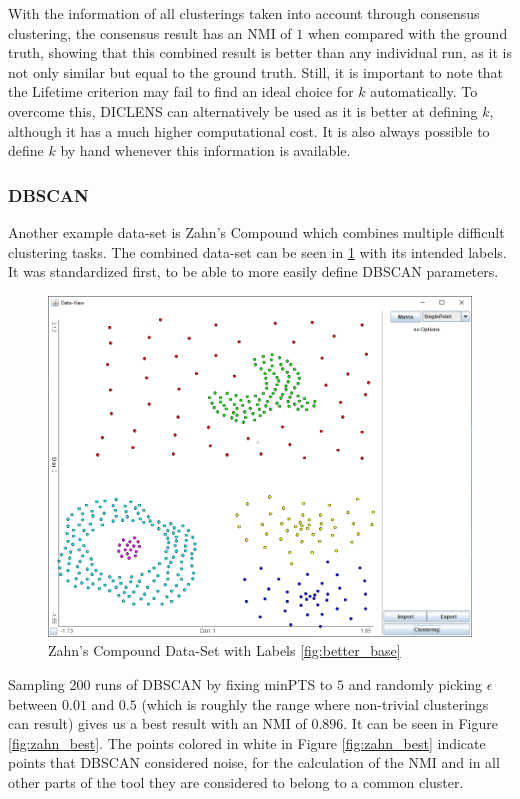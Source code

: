 \documentclass[
	a4paper,
	english,
	twoside,
	openright,               
	11pt                            
	]{report}
\begin{document}
With the information of all clusterings taken into account through consensus clustering, the consensus result has an NMI of $1$ when compared with the ground truth, showing that this combined result is better than any individual run, as it is not only similar but equal to the ground truth. Still, it is important to note that the Lifetime criterion may fail to find an ideal choice for $k$ automatically. To overcome this, DICLENS can alternatively be used as it is better at defining $k$, although it has a much higher computational cost. It is also always possible to define $k$ by hand whenever this information is available.

\subsubsection{DBSCAN}
Another example data-set is Zahn's Compound \cite{1671676} which combines multiple difficult clustering tasks. The combined data-set can be seen in \ref{fig:zahn} with its intended labels. It was standardized first, to be able to more easily define DBSCAN parameters.

\begin{figure}[h]
	\centering
	\includegraphics[scale=.5]{zahn}
	\caption{Zahn's Compound Data-Set with Labels \ref{fig:better_base}}
	\label{fig:zahn}
\end{figure}

Sampling 200 runs of DBSCAN by fixing minPTS to $5$ and randomly picking $\epsilon$ between $0.01$ and $0.5$ (which is roughly the range where non-trivial clusterings can result) gives us a best result with an NMI of $0.896$. It can be seen in Figure \ref{fig:zahn_best}. The points colored in white in Figure \ref{fig:zahn_best} indicate points that DBSCAN considered noise, for the calculation of the NMI and in all other parts of the tool they are considered to belong to a common cluster.
\end{document}
